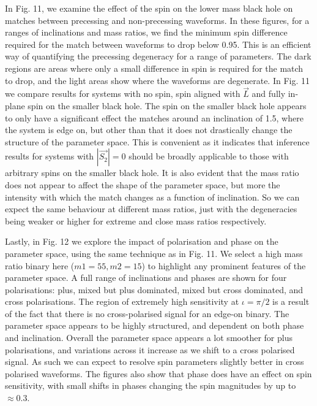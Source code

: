 \documentclass[11pt]{article}
\begin{document}
In Fig. 11, we examine the effect of the spin on the lower mass black hole on matches between precessing and non-precessing waveforms. In these figures, for a ranges of inclinations and mass ratios, we find the minimum spin difference required for the match between waveforms to drop below 0.95. This is an efficient way of quantifying the precessing degeneracy for a range of parameters. The dark regions are areas where only a small difference in spin is required for the match to drop, and the light areas show where the waveforms are degenerate. In Fig. 11 we compare results for systems with no spin, spin aligned with $\vec{L}$ and fully in-plane spin on the smaller black hole. The spin on the smaller black hole appears to only have a significant effect the matches around an inclination of 1.5, where the system is edge on, but other than that it does not drastically change the structure of the parameter space. This is convenient as it indicates that inference results for systems with $|\vec{S_2}|=0$ should be broadly applicable to those with arbitrary spins on the smaller black hole. It is also evident that the mass ratio does not appear to affect the shape of the parameter space, but more the intensity with which the match changes as a function of inclination. So we can expect the same behaviour at different mass ratios, just with the degeneracies being weaker or higher for extreme and close mass ratios respectively.



Lastly, in Fig. 12 we explore the impact of polarisation and phase on the parameter space, using the same technique as in Fig. 11. We select a high mass ratio binary here ($m1=55, m2=15$) to highlight any prominent features of the parameter space. A full range of inclinations and phases are shown for four polarisations: plus, mixed but plus dominated, mixed but cross dominated, and cross polarisations. The region of extremely high sensitivity at $\iota=\pi/2$ is a result of the fact that there is no cross-polarised signal for an edge-on binary. The parameter space appears to be highly structured, and dependent on both phase and inclination. Overall the parameter space appears a lot smoother for plus polarisations, and variations across it increase as we shift to a cross polarised signal. As such we can expect to resolve spin parameters slightly better in cross polarised waveforms. The figures also show that phase does have an effect on spin sensitivity, with small shifts in phases changing the spin magnitudes by up to $\approx0.3$.
\end{document}
